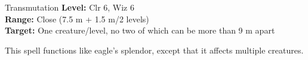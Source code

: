 {Transmutation}
{
	\textbf{Level:}
	Clr 6, Wiz 6\\
	\textbf{Range:}
	Close (7.5 m + 1.5 m/2 levels)\\
	\textbf{Target:}
	One creature/level, no two of which can be more than 9 m apart\\
}
{
	This spell functions like eagle's splendor, except that it affects multiple creatures.

}
